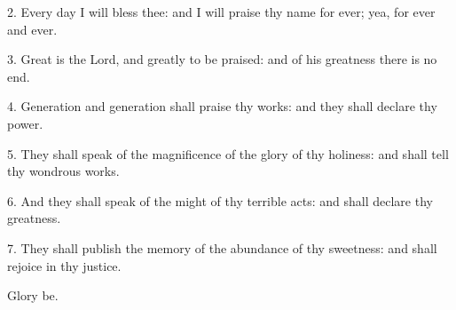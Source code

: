  	
 2. Every day I will bless thee: and I will praise thy name for ever; yea, for ever and ever.
 	
 3. Great is the Lord, and greatly to be praised: and of his greatness there is no end.
 	
 4. Generation and generation shall praise thy works: and they shall declare thy power.
 	
 5. They shall speak of the magnificence of the glory of thy holiness: and shall tell thy wondrous works.

6. And they shall speak of the might of thy terrible acts: and shall declare thy greatness.

7. They shall publish the memory of the abundance of thy sweetness: and shall rejoice in thy justice.

Glory be.

